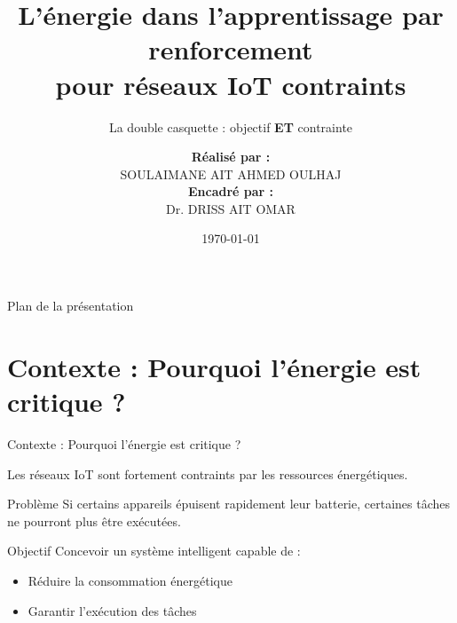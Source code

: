 \documentclass[10pt,aspectratio=169]{beamer}
\title{L'énergie dans l'apprentissage par renforcement \\ pour réseaux IoT contraints}
\subtitle{La double casquette : objectif \textbf{ET} contrainte}
\author{
\begin{tabular}{c}
\textbf{Réalisé par :} \\ 
SOULAIMANE AIT AHMED OULHAJ \\[0.5cm]
\textbf{Encadré par :} \\ 
Dr. DRISS AIT OMAR
\end{tabular}
}
\date{\today}
\begin{document}
\begin{frame}
\titlepage
\end{frame}

\begin{frame}{Plan de la présentation}
\tableofcontents[sectionstyle=show/shaded]
\end{frame}

\section{Contexte : Pourquoi l'énergie est critique ?}

\begin{frame}{Contexte : Pourquoi l'énergie est critique ?}

Les réseaux IoT sont fortement contraints par les ressources énergétiques.

\begin{block}{Problème}
Si certains appareils épuisent rapidement leur batterie, certaines tâches ne pourront plus être exécutées.
\end{block}

\begin{alertblock}{Objectif}
Concevoir un système intelligent capable de :
\begin{itemize}
    \item Réduire la consommation énergétique
    \item Garantir l'exécution des tâches
\end{itemize}
\end{alertblock}
\end{frame}
\end{document}
